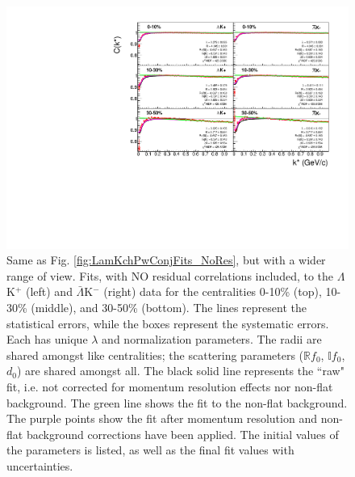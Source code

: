 \documentclass[../AnalysisNoteJBuxton.tex]{subfiles}
\begin{document}
\begin{figure}[h]
  \centering
  \includegraphics[width=\textwidth]{7_ResultsAndDiscussion/Figures/canKStarCfwFitsLamKchPwConj_0010_1030_3050UnZoomed_MomResCrctn_NonFlatBgdCrctn.pdf}
  \caption[$\Lambda$K$^{+}$($\bar{\Lambda}$K$^{-}$) Fits with No Residuals (Wide Range)]{Same as Fig. \ref{fig:LamKchPwConjFits_NoRes}, but with a wider range of view.
Fits, with NO residual correlations included, to the $\Lambda$K$^{+}$ (left) and $\bar{\Lambda}$K$^{-}$ (right) data for the centralities 0-10\% (top), 10-30\% (middle), and 30-50\% (bottom).
The lines represent the statistical errors, while the boxes represent the systematic errors.  
Each has unique $\lambda$ and normalization parameters.
The radii are shared amongst like centralities; the scattering parameters ($\mathbb{R}f_{0}$, $\mathbb{I}f_{0}$, $d_{0}$) are shared amongst all.
The black solid line represents the ``raw" fit, i.e. not corrected for momentum resolution effects nor non-flat background.  
The green line shows the fit to the non-flat background.
The purple points show the fit after momentum resolution and non-flat background corrections have been applied.
The initial values of the parameters is listed, as well as the final fit values with uncertainties.}
  \label{fig:LamKchPwConjFitsUnZoomed_NoRes}
\end{figure}
\end{document}
